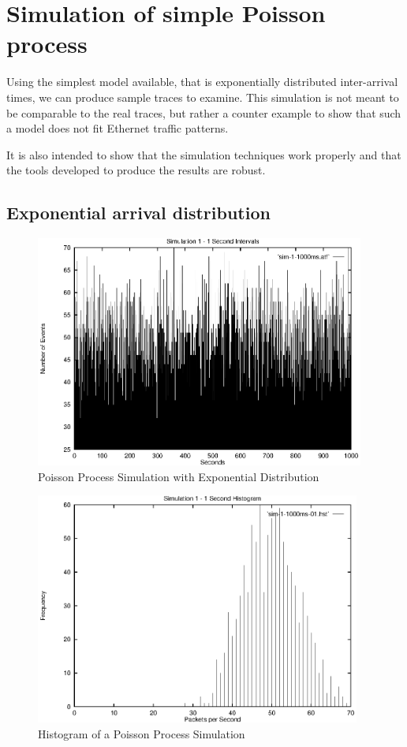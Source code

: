\section{Simulation of simple Poisson process}
\label{simulation:simplepp}

Using the simplest model available, that is exponentially distributed
inter-arrival times, we can produce sample traces to examine.  This
simulation is not meant to be comparable to the real traces, but
rather a counter example to show that such a model does not fit
Ethernet traffic patterns.

It is also intended to show that the simulation techniques work
properly and that the tools developed to produce the results are
robust.

\subsection{Exponential arrival distribution}

\begin{figure}
\includegraphics[height=3in]{pics/sim-1-1s-freq.eps}
\caption{Poisson Process Simulation with Exponential Distribution}
\label{simulation:sim1.1s.freq}
\end{figure}

\begin{figure}
\includegraphics[height=3in]{pics/sim-1-1s-hist-01.eps}
\caption{Histogram of a Poisson Process Simulation}
\label{simulation:sim1.1s.hist}
\end{figure}

